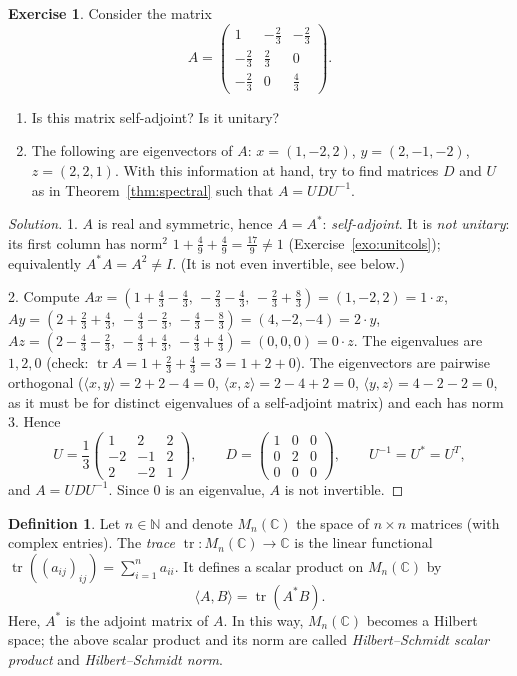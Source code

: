\documentclass[11pt,a4paper]{article}
\numberwithin{equation}{section}
\newcommand{\N}{\mathbb{N}}
\newcommand{\C}{\mathbb{C}}
\newcommand{\ip}[2]{\langle #1, #2\rangle}
\DeclareMathOperator{\tr}{tr}
\theoremstyle{plain}
\theoremstyle{definition}
\newtheorem{definition}[theorem]{Definition}
\newtheorem{exercise}[theorem]{Exercise}
\theoremstyle{plain}
\theoremstyle{definition}
\newenvironment{solution}{\begin{proof}[Solution]}{\end{proof}}
\begin{document}
\begin{exercise}
Consider the matrix
\[
A=\begin{pmatrix}1&-\frac23&-\frac23\\-\frac23&\frac23&0\\-\frac23&0&\frac43\end{pmatrix}.
\]
\begin{enumerate}
\item Is this matrix self-adjoint? Is it unitary?
\item The following are eigenvectors of $A$: $x=(1,-2,2)$, $y=(2,-1,-2)$, $z=(2,2,1)$.
With this information at hand, try to find matrices $D$ and $U$ as in
Theorem~\ref{thm:spectral} such that $A=UDU^{-1}$.
\end{enumerate}
\end{exercise}
\begin{solution}
1. $A$ is real and symmetric, hence $A=A^*$: \emph{self-adjoint}. It is \emph{not unitary}:
its first column has norm$^2$ $1+\frac49+\frac49=\frac{17}9\ne1$ (Exercise~\ref{exo:unitcols});
equivalently $A^*A=A^2\ne I$. (It is not even invertible, see below.)

2. Compute $Ax=(1+\frac43-\frac43,\,-\frac23-\frac43,\,-\frac23+\frac83)=(1,-2,2)=1\cdot x$,
$Ay=(2+\frac23+\frac43,\,-\frac43-\frac23,\,-\frac43-\frac83)=(4,-2,-4)=2\cdot y$,
$Az=(2-\frac43-\frac23,\,-\frac43+\frac43,\,-\frac43+\frac43)=(0,0,0)=0\cdot z$.
The eigenvalues are $1,2,0$ (check: $\tr A=1+\frac23+\frac43=3=1+2+0$). The eigenvectors
are pairwise orthogonal ($\ip xy=2+2-4=0$, $\ip xz=2-4+2=0$, $\ip yz=4-2-2=0$, as it must
be for distinct eigenvalues of a self-adjoint matrix) and each has norm $3$. Hence
\[
U=\frac13\begin{pmatrix}1&2&2\\-2&-1&2\\2&-2&1\end{pmatrix},\qquad
D=\begin{pmatrix}1&0&0\\0&2&0\\0&0&0\end{pmatrix},\qquad U^{-1}=U^*=U^T,
\]
and $A=UDU^{-1}$. Since $0$ is an eigenvalue, $A$ is not invertible.
\end{solution}

\begin{definition}\label{def:HS}
Let $n\in\N$ and denote $M_n(\C)$ the space of $n\times n$ matrices (with complex entries).
The \emph{trace} $\tr:M_n(\C)\to\C$ is the linear functional $\tr((a_{ij})_{ij})=\sum_{i=1}^na_{ii}$.
It defines a scalar product on $M_n(\C)$ by
\[
\ip{A}{B}=\tr(A^*B).
\]
Here, $A^*$ is the adjoint matrix of $A$. In this way, $M_n(\C)$ becomes a Hilbert space;
the above scalar product and its norm are called \emph{Hilbert--Schmidt scalar product} and
\emph{Hilbert--Schmidt norm}.
\end{definition}
\end{document}
